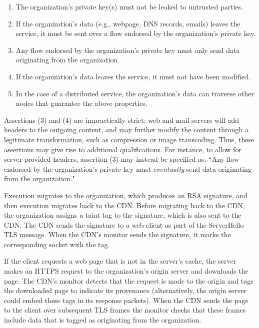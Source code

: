 \begin{enumerate}
    \item The organization's private key(s) must not be leaked to untrusted parties.

    \item If the organization's data (e.g., webpage, DNS records, emails) leaves the
        service, it must be sent over a flow endorsed by the organization's private
        key.

    \item Any flow endorsed by the organization's private key must only send
        data originating from the organization.

    \item If the organization's data leaves the service, it must not have been
        modified.

    \item In the case of a distributed service, the organization's data can
        traverse other nodes that  guarantee the above properties.
\end{enumerate}

Assertions (3) and (4) are impractically strict: web and mail servers will add
headers to the outgoing content, and may further modify the content through a
legitimate transformation, such as compression or image transcoding.
%
Thus, these assertions may give rise to additional qualificaitons.
%
For instance, to allow for server-provided headers, assertion (3) may instead
be specified as: ``Any flow endorsed by the organization's private key must
\emph{eventually} send data originating from the organization."


%
Execution migrates to the organization, which produces an RSA signature, and
then execution migrates back to the CDN\@.
%
Before migrating back to the CDN, the organization assigns a taint tag to the
signature, which is also sent to the CDN\@.
%
The CDN sends the signature to a web client as part of the ServerHello TLS
message.
%
When the CDN's monitor sends the signature, it marks the corresponding socket
with the tag.


If the client requests a web page that is not in the server's cache, the server
makes an HTTPS request to the organization's origin server and downloads the
page.
%
The CDN's monitor detects that the request is made to the origin and tags the
downloaded page to indicate its provenance (alternatively, the origin server
could embed these tags in its response packets).
%
When the CDN sends the page to the client over subsequent TLS frames the
monitor checks that these frames include data that is tagged as originating
from the organization. 



